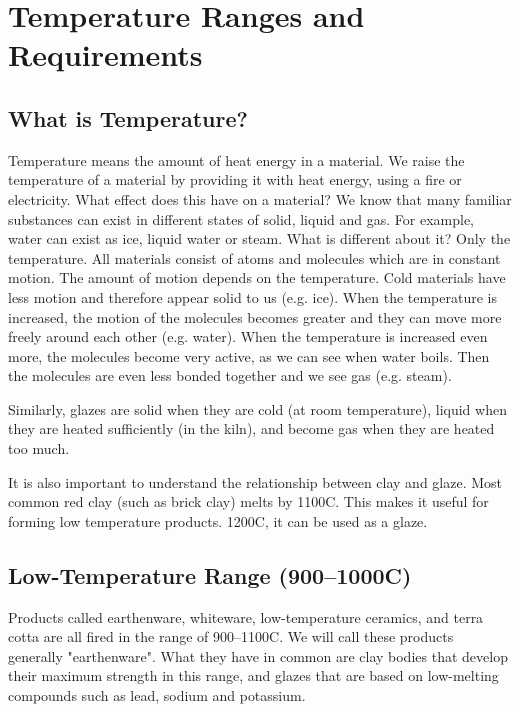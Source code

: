 \chapter{Temperature Ranges and Requirements}
\section{What is Temperature?}
Temperature means the amount of heat energy in a material. We raise the 
temperature of a material by providing it with heat energy, using a fire or 
electricity. What effect does this have on a material? We know that many 
familiar substances can exist in different states of solid, liquid and gas. For 
example, water can exist as ice, liquid water or steam. What is different about 
it? Only the temperature. All materials consist of atoms and molecules which 
are in constant motion. The amount of motion depends on the temperature. Cold 
materials have less motion and therefore appear solid to us (e.g. ice). When 
the temperature is increased, the motion of the molecules becomes greater and 
they can move more freely around each other (e.g. water). When the temperature 
is increased even more, the molecules become very active, as we can see when 
water boils. Then the molecules are even less bonded together and we see gas 
(e.g. steam).

Similarly, glazes are solid when they are cold (at room temperature), liquid 
when they are heated sufficiently (in the kiln), and become gas when they are 
heated too much.

It is also important to understand the relationship between clay and glaze. 
Most common red clay (such as brick clay) melts by 1100\degree C. This makes it 
useful for forming low temperature products. 1200\degree C, it can be used as a 
glaze.
\section{Low-Temperature Range (900--1000\degree C)}
Products called earthenware, whiteware, low-temperature ceramics, and terra 
cotta are all fired in the range of 900--1100\degree C. We will call these 
products 
generally "earthenware". What they have in common are clay bodies that develop 
their maximum strength in this range, and glazes that are based on low-melting 
compounds such as lead, sodium and potassium.
